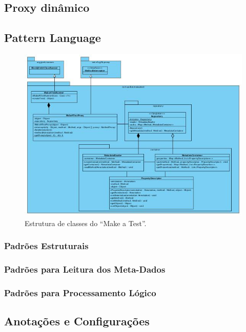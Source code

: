 \documentclass{abnt}
\begin{document}
\subsection{Proxy dinâmico}

\subsection{Pattern Language}

\begin{figure}[!ht]
	\centering
	\includegraphics[scale=0.70]{uml/makeatest.jpg}
	\caption{Estrutura de classes do ``Make a Test''.}
	\label{uml-class-makeatest}
\end{figure}


\subsubsection{Padrões Estruturais}



\subsubsection{Padrões para Leitura dos Meta-Dados}
\subsubsection{Padrões para Processamento Lógico}

\subsection{Anotações e Configurações}
\end{document}
